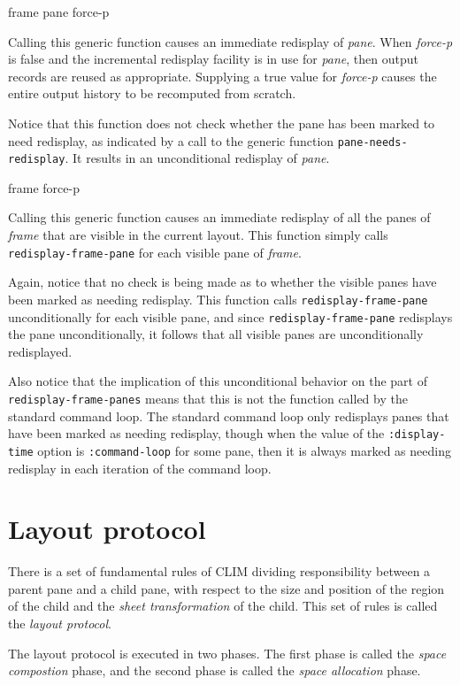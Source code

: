  {frame pane \key force-p}

Calling this generic function causes an immediate redisplay of
\textit{pane}.  When \textit{force-p} is false and the incremental
redisplay facility is in use for \textit{pane}, then output records are
reused as appropriate.  Supplying a true value for \textit{force-p}
causes the entire output history to be recomputed from scratch.

Notice that this function does not check whether the pane has been
marked to need redisplay, as indicated by a call to the generic
function \texttt{pane-needs-redisplay}.  It results in an
unconditional redisplay of \textit{pane}.

 {frame \key force-p}

Calling this generic function causes an immediate redisplay of all the
panes of \textit{frame} that are visible in the current layout.  This
function simply calls \texttt{redisplay-frame-pane} for each visible
pane of \textit{frame}.

Again, notice that no check is being made as to whether the visible
panes have been marked as needing redisplay.  This function calls
\texttt{redisplay-frame-pane} unconditionally for each visible pane,
and since \texttt{redisplay-frame-pane} redisplays the pane
unconditionally, it follows that all visible panes are unconditionally
redisplayed.

Also notice that the implication of this unconditional behavior on the
part of \texttt{redisplay-frame-panes} means that this is not the
function called by the standard command loop.  The standard command
loop only redisplays panes that have been marked as needing redisplay,
though when the value of the \texttt{:display-time} option is
\texttt{:command-loop} for some pane, then it is always marked as
needing redisplay in each iteration of the command loop.

\section{Layout protocol}

There is a set of fundamental rules of CLIM dividing responsibility
between a parent pane and a child pane, with respect to the size and
position of the region of the child and the \emph{sheet transformation}
of the child.  This set of rules is called the \emph{layout protocol}.

The layout protocol is executed in two phases.  The first phase is
called the \emph{space compostion} phase, and the second phase is
called the \emph{space allocation} phase.


